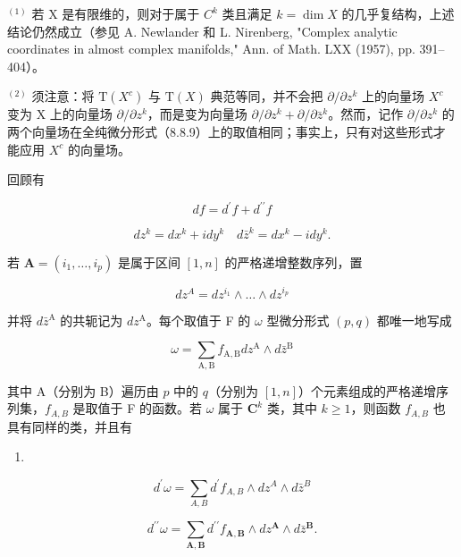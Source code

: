 \(^{(1)}\) 若 X 是有限维的，则对于属于 \(C^k\) 类且满足 \(k = \dim X\) 的几乎复结构，上述结论仍然成立（参见 A. Newlander 和 L. Nirenberg, "Complex analytic coordinates in almost complex manifolds," Ann. of Math. LXX (1957), pp. 391--404）。

\(^{(2)}\) 须注意：将 \(\mathrm{T}(X^c)\) 与 \(\mathrm{T}(X)\) 典范等同，并不会把 \(\partial/\partial z^k\) 上的向量场 \(X^c\) 变为 X 上的向量场 \(\partial/\partial z^k\)，而是变为向量场 \(\partial/\partial z^k+\partial/\partial\bar z^k\)。然而，记作 \(\partial/\partial z^k\) 的两个向量场在全纯微分形式（8.8.9）上的取值相同；事实上，只有对这些形式才能应用 \(X^c\) 的向量场。

回顾有

\[
d f = d ^ {\prime} f + d ^ {\prime \prime} f
\]

\[
d z ^ {k} = d x ^ {k} + i d y ^ {k} \quad d \bar {z} ^ {k} = d x ^ {k} - i d y ^ {k}.
\]

若 \(\mathbf{A}=(i_{1},\ldots,i_{p})\) 是属于区间 \([1,n]\) 的严格递增整数序列，置

\[
d z ^ {A} = d z ^ {i _ {1}} \wedge \dots \wedge d z ^ {i _ {p}}
\]

并将 \(d\bar{z}^{\mathrm{A}}\) 的共轭记为 \(dz^{\mathrm{A}}\)。每个取值于 F 的 \(\omega\) 型微分形式 \((p,q)\) 都唯一地写成

\[
\omega = \sum_ {\mathrm{A}, \mathrm{B}} f _ {\mathrm{A}, \mathrm{B}} d z ^ {\mathrm{A}} \wedge d \bar {z} ^ {\mathrm{B}}\tag{11}
\]

其中 A（分别为 B）遍历由 \(p\) 中的 \(q\)（分别为 \([1, n]\)）个元素组成的严格递增序列集，\(f_{A,B}\) 是取值于 F 的函数。若 \(\omega\) 属于 \(\mathbf{C}^k\) 类，其中 \(k \geqslant 1\)，则函数 \(f_{A,B}\) 也具有同样的类，并且有

\begin{enumerate}
\def\labelenumi{(\arabic{enumi})}
\setcounter{enumi}{11}
\tightlist
\item
\end{enumerate}
\[
d ^ {\prime} \omega = \sum_ {A, B} d ^ {\prime} f _ {A, B} \wedge d z ^ {A} \wedge d \bar {z} ^ {B}\tag{12}
\]

\[
d ^ {\prime \prime} \omega = \sum_ {\mathbf {A}, \mathbf {B}} d ^ {\prime \prime} f _ {\mathbf {A}, \mathbf {B}} \wedge d z ^ {\mathbf {A}} \wedge d \bar {z} ^ {\mathbf {B}}.\tag{13}
\]

